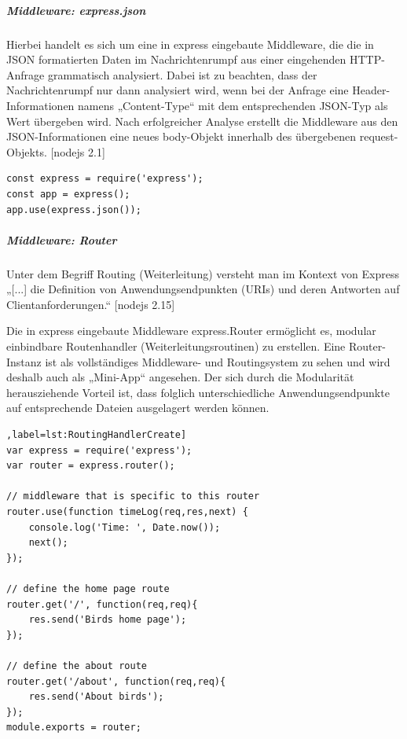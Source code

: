 \subparagraph{Middleware: express.json}

Hierbei handelt es sich um eine in express eingebaute Middleware, die die in JSON formatierten Daten im Nachrichtenrumpf aus einer eingehenden HTTP-Anfrage grammatisch analysiert.  Dabei ist zu beachten, dass der Nachrichtenrumpf nur dann analysiert wird, wenn bei der Anfrage eine Header-Informationen namens „Content-Type“ mit dem entsprechenden JSON-Typ als Wert übergeben wird. Nach erfolgreicher Analyse erstellt die Middleware aus den JSON-Informationen eine neues body-Objekt innerhalb des übergebenen request-Objekts. [nodejs 2.1]
\newline

\begin{lstlisting}[caption=Express.json Middleware benutzen,label=lst:ExpressNutzen]
const express = require('express');
const app = express();
app.use(express.json());
\end{lstlisting}

\newpage
\subparagraph{Middleware: Router}

Unter dem Begriff Routing (Weiterleitung) versteht man im Kontext von Express „[...] die Definition von Anwendungsendpunkten (URIs) und deren Antworten auf Clientanforderungen.“ [nodejs 2.15]
\newline

Die in express eingebaute Middleware express.Router ermöglicht es, modular einbindbare Routenhandler (Weiterleitungsroutinen) zu erstellen. Eine Router-Instanz ist als vollständiges Middleware- und Routingsystem zu sehen und wird deshalb auch als „Mini-App“ angesehen. Der sich durch die Modularität herausziehende Vorteil ist, dass folglich unterschiedliche Anwendungsendpunkte auf entsprechende Dateien ausgelagert werden können.
\newline

\begin{lstlisting}[caption=Routinghandler erstellen[nodejs 2.2],label=lst:RoutingHandlerCreate]
var express = require('express');
var router = express.router();

// middleware that is specific to this router
router.use(function timeLog(req,res,next) {
	console.log('Time: ', Date.now());
	next();
});

// define the home page route
router.get('/', function(req,req){
	res.send('Birds home page');
});

// define the about route
router.get('/about', function(req,req){
	res.send('About birds');
});
module.exports = router;
\end{lstlisting}

